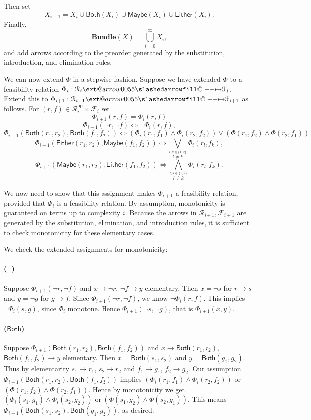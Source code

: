 \documentclass[12pt]{article}
\makeatletter
\theoremstyle{definition}
\theoremstyle{plain}
\theoremstyle{plain}
\theoremstyle{plain}
\theoremstyle{plain}
\theoremstyle{remark}
\theoremstyle{remark}
\newcommand{\mc}[1]{\mathcal{#1}}
\newcommand{\maybe}{\mathsf{Maybe}}
\newcommand{\either}{\mathsf{Either}}
\newcommand{\both}{\mathsf{Both}}
\def\slashedarrowfill@#1#2#3#4#5{%
	$\m@th\thickmuskip0mu\medmuskip\thickmuskip\thinmuskip\thickmuskip
	\relax#5#1\mkern-7mu%
	\cleaders\hbox{$#5\mkern-2mu#2\mkern-2mu$}\hfill
	\mathclap{#3}\mathclap{#2}%
	\cleaders\hbox{$#5\mkern-2mu#2\mkern-2mu$}\hfill
	\mkern-7mu#4$%
}
\def\rightslashedarrowfill@{%
	\slashedarrowfill@\relbar\relbar\mapstochar\rightarrow}
\newcommand\xslashedrightarrow[2][]{%
	\ext@arrow 0055{\rightslashedarrowfill@}{#1}{#2}}
\makeatother
\begin{document}
Then set $$X_{i+1} = X_i \cup \both(X_i) \cup \maybe(X_i) \cup \either(X_i).$$ Finally, $$\mathbf{Bundle}(X) = \bigcup_{i=0}^{\infty} X_i,$$
and add arrows according to the preorder generated by the substitution, introduction, and elimination rules.

We can now extend $\Phi$ in a stepwise fashion. Suppose we have extended $\Phi$ to a feasibility relation $\Phi_i: \mc{R}_i \xslashedrightarrow{} \mc{F}_i$. Extend this to $\Phi_{i+1}: \mc{R}_{i+1} \xslashedrightarrow{} \mc{F}_{i+1}$ as follows. For $(r,f) \in \mc{R}_i^{\text{op}} \times \mc{F}_i$ set 
$$\Phi_{i+1}(r,f) = \Phi_i(r,f)$$ 
$$\Phi_{i+1}(\neg r, \neg f)  \Leftrightarrow \neg \Phi_i(r,f),$$
$$\Phi_{i+1}(\both(r_1,r_2),\both(f_1,f_2)) \Leftrightarrow (\Phi_i(r_1,f_1) \wedge \Phi_i(r_2,f_2)) \vee (\Phi(r_1,f_2) \wedge \Phi(r_2,f_1))$$
$$\Phi_{i+1}(\either(r_1,r_2),\maybe(f_1,f_2)) \Leftrightarrow \bigvee_{\stackrel{l,k \in \{1,2\}} {l\neq k}}\Phi_i(r_l,f_k) , $$
$$\Phi_{i+1}(\maybe(r_1,r_2),\either(f_1,f_2)) \Leftrightarrow \bigwedge_{\stackrel{l,k \in \{1,2\}} {l\neq k}}\Phi_i(r_l,f_k). $$

We now need to show that this assignment makes $\Phi_{i+1}$ a feasibility relation, provided that $\Phi_i$ is a feasibility relation. By assumption, monotonicity is guaranteed on terms up to complexity $i$. Because the arrows in $\mc{R}_{i+1}, \mc{F}_{i+1}$ are generated by the substitution, elimination, and introduction rules, it is sufficient to check monotonicity for these elementary cases.

We check the extended assignments for monotonicity:

\paragraph{($\neg$)} Suppose $\Phi_{i+1}(\neg r, \neg f)$ and $x \rightarrow \neg r$, $\neg f \rightarrow y$ elementary. Then $x = \neg s$ for $r \rightarrow s$ and $y = \neg g$ for $g \rightarrow f$. Since $\Phi_{i+1}(\neg r, \neg f)$, we know $\neg \Phi_i(r,f)$. This implies $\neg \Phi_i(s,g)$, since $\Phi_i$ monotone. Hence $\Phi_{i+1}(\neg s, \neg g)$, that is $\Phi_{i+1}(x,y)$.

\paragraph{($\both$)} Suppose $\Phi_{i+1}(\both(r_1,r_2),\both(f_1,f_2))$ and $x \rightarrow \both(r_1,r_2)$, $\both(f_1,f_2) \rightarrow y$ elementary. Then $x = \both(s_1,s_2)$ and $y = \both(g_1,g_2)$. Thus by elementarity $s_1 \rightarrow r_1$, $s_2 \rightarrow r_2$ and $f_1 \rightarrow g_1$, $f_2 \rightarrow g_2$. Our assumption $\Phi_{i+1}(\both(r_1,r_2),\both(f_1,f_2))$ implies $(\Phi_i(r_1,f_1) \wedge \Phi_i(r_2,f_2))$ or $(\Phi(r_1,f_2) \wedge \Phi(r_2,f_1))$. Hence by monotonicity we get $(\Phi_i(s_1,g_1) \wedge \Phi_i(s_2,g_2))$ or $(\Phi(s_1,g_2) \wedge \Phi(s_2,g_1))$. This means $\Phi_{i+1}(\both(s_1,s_2),\both(g_1,g_2))$, as desired.
\end{document}
